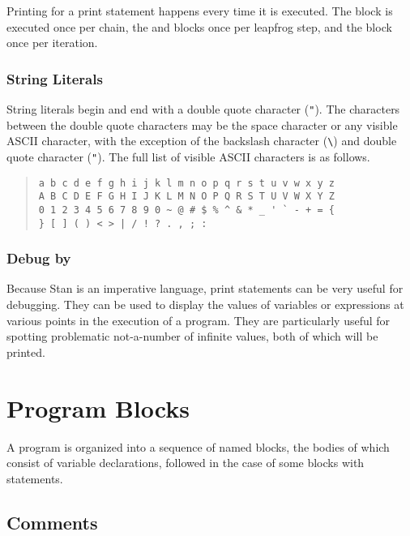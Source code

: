 Printing for a print statement happens every time it is executed.  The
 block is executed once per chain, the
 and  blocks once per leapfrog
step, and the  block once per iteration.

\subsection{String Literals}

String literals begin and end with a double quote character
(\Verb|"|).  The characters between the double quote characters may be
the space character or any visible ASCII character, with the exception
of the backslash character (\Verb|\|) and double quote character
(\Verb|"|).  The full list of visible ASCII characters is as follows.
%
\begin{quote}
\begin{Verbatim}[fontsize=\small]
a b c d e f g h i j k l m n o p q r s t u v w x y z
A B C D E F G H I J K L M N O P Q R S T U V W X Y Z
0 1 2 3 4 5 6 7 8 9 0 ~ @ # $ % ^ & * _ ' ` - + = { 
} [ ] ( ) < > | / ! ? . , ; :
\end{Verbatim}
\end{quote}

\subsection{Debug by }

Because Stan is an imperative language, print statements can be very
useful for debugging.  They can be used to display the values of
variables or expressions at various points in the execution of a
program.  They are particularly useful for spotting problematic
not-a-number of infinite values, both of which will be printed.




\chapter{Program Blocks}\label{blocks.chapter}

\noindent
A \Stan program is organized into a sequence of named blocks, the
bodies of which consist of variable declarations, followed in the case
of some blocks with statements.  

\section{Comments}\label{comments.section}

